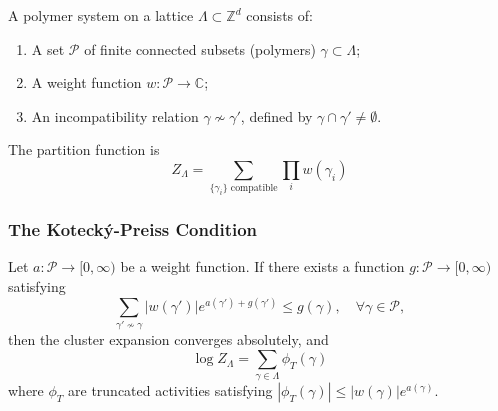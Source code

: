 \begin{definition}
A polymer system on a lattice $\Lambda \subset \mathbb{Z}^d$ consists of:
\begin{enumerate}
    \item A set $\mathcal{P}$ of finite connected subsets (polymers) $\gamma \subset \Lambda$;
    \item A weight function $w: \mathcal{P} \to \mathbb{C}$;
    \item An incompatibility relation $\gamma \nsim \gamma'$, defined by $\gamma \cap \gamma' \neq \emptyset$.
\end{enumerate}
The partition function is
\begin{equation}
    Z_\Lambda = \sum_{\{\gamma_i\} \text{ compatible}} \prod_i w(\gamma_i)
\end{equation}
\end{definition}

\subsubsection{The Koteck\'y-Preiss Condition}

\begin{theorem}\label{sec:thm:kp-criterion}
Let $a: \mathcal{P} \to [0, \infty)$ be a weight function. If there exists a function $g: \mathcal{P} \to [0, \infty)$ satisfying
\begin{equation}
    \sum_{\gamma' \nsim \gamma} |w(\gamma')| e^{a(\gamma') + g(\gamma')} \leq g(\gamma), \quad \forall \gamma \in \mathcal{P},
\end{equation}
then the cluster expansion converges absolutely, and
\begin{equation}
    \log Z_\Lambda = \sum_{\gamma \in \Lambda} \phi_T(\gamma)
\end{equation}
where $\phi_T$ are truncated activities satisfying $|\phi_T(\gamma)| \leq |w(\gamma)| e^{a(\gamma)}$.
\end{theorem}

